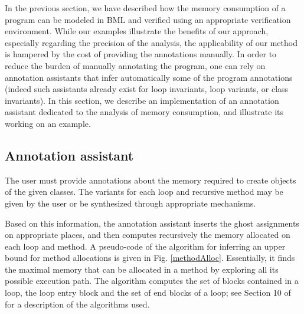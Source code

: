 In the previous section, we have described how the memory consumption
of a program can be modeled in BML and verified using an appropriate
verification environment. While our examples illustrate the benefits
of our approach, especially regarding the precision of the analysis,
the applicability of our method is hampered by the cost of providing
the annotations manually. In order to reduce the burden of manually
annotating the program, one can rely on annotation assistants that
infer automatically some of the program annotations (indeed such
assistants already exist for loop invariants, loop variants, or
class invariants). In this section, we describe an implementation of
an annotation assistant dedicated to the analysis of memory consumption,
and illustrate its working on an example.

\subsection{Annotation assistant}
The user must provide annotations about the memory required to create objects of the given classes. The variants for each loop and recursive method may be given by the user or be synthesized through appropriate mechanisms.


Based on this information, the annotation assistant 
inserts the ghost assignments on appropriate places, and then computes
recursively the memory allocated on each loop and method. 
A pseudo-code of the algorithm for inferring an upper bound for method allocations is given in Fig. \ref{methodAlloc}.
Essentially, it finds the maximal memory that can be allocated in a method by exploring all its possible execution path.
The algorithm computes the set of blocks contained in a loop, the loop entry block and the set of end blocks of a loop; see Section 10 of  \cite{ASU86cpt} for a description of the algorithms used.

